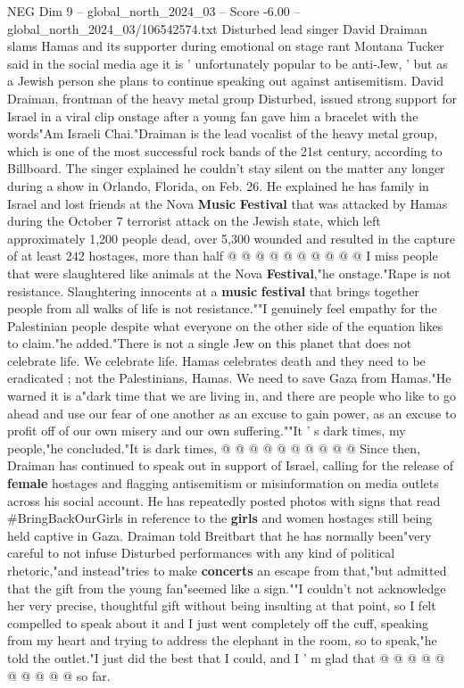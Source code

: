 \begin{textsample}{NEG Dim 9 – global\_north\_2024\_03 – Score -6.00 – global\_north\_2024\_03/106542574.txt}  \label{ex:f9_neg_248}
Disturbed lead singer David Draiman slams Hamas and its supporter during emotional on stage rant Montana Tucker said in the social media age it is ' unfortunately popular to be anti-Jew, ' but as a Jewish person she plans to continue speaking out against antisemitism.
David Draiman, frontman of the heavy metal group Disturbed, issued strong support for Israel in a viral clip onstage after a young fan gave him a bracelet with the words"Am Israeli Chai."Draiman is the lead vocalist of the heavy metal group, which is one of the most successful rock bands of the 21st century, according to Billboard.
The singer explained he couldn't stay silent on the matter any longer during a show in Orlando, Florida, on Feb. 26.
He explained he has family in Israel and lost friends at the Nova \textbf{Music} \textbf{Festival} that was attacked by Hamas during the October 7 terrorist attack on the Jewish state, which left approximately 1,200 people dead, over 5,300 wounded and resulted in the capture of at least 242 hostages, more than half @ @ @ @ @ @ @ @ @ @ I miss people that were slaughtered like animals at the Nova \textbf{Festival},"he onstage."Rape is not resistance.
Slaughtering innocents at a \textbf{music} \textbf{festival} that brings together people from all walks of life is not resistance.""I genuinely feel empathy for the Palestinian people despite what everyone on the other side of the equation likes to claim."he added."There is not a single Jew on this planet that does not celebrate life.
We celebrate life.
Hamas celebrates death and they need to be eradicated ; not the Palestinians, Hamas.
We need to save Gaza from Hamas."He warned it is a"dark time that we are living in, and there are people who like to go ahead and use our fear of one another as an excuse to gain power, as an excuse to profit off of our own misery and our own suffering.""It ' s dark times, my people,"he concluded."It is dark times, @ @ @ @ @ @ @ @ @ @ Since then, Draiman has continued to speak out in support of Israel, calling for the release of \textbf{female} hostages and flagging antisemitism or misinformation on media outlets across his social account.
He has repeatedly posted photos with signs that read \#BringBackOurGirls in reference to the \textbf{girls} and women hostages still being held captive in Gaza.
Draiman told Breitbart that he has normally been"very careful to not infuse Disturbed performances with any kind of political rhetoric,"and instead"tries to make \textbf{concerts} an escape from that,"but admitted that the gift from the young fan"seemed like a sign.""I couldn't not acknowledge her very precise, thoughtful gift without being insulting at that point, so I felt compelled to speak about it and I just went completely off the cuff, speaking from my heart and trying to address the elephant in the room, so to speak,"he told the outlet."I just did the best that I could, and I ' m glad that @ @ @ @ @ @ @ @ @ @ so far.

\end{textsample}
